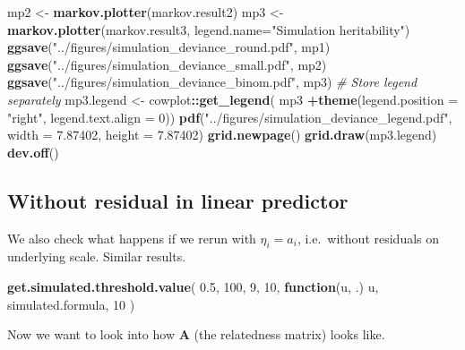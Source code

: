 \documentclass[
]{article}
\newenvironment{Shaded}{\begin{snugshade}}{\end{snugshade}}
\newcommand{\AttributeTok}[1]{\textcolor[rgb]{0.13,0.29,0.53}{#1}}
\newcommand{\CommentTok}[1]{\textcolor[rgb]{0.56,0.35,0.01}{\textit{#1}}}
\newcommand{\ControlFlowTok}[1]{\textcolor[rgb]{0.13,0.29,0.53}{\textbf{#1}}}
\newcommand{\DecValTok}[1]{\textcolor[rgb]{0.00,0.00,0.81}{#1}}
\newcommand{\FloatTok}[1]{\textcolor[rgb]{0.00,0.00,0.81}{#1}}
\newcommand{\FunctionTok}[1]{\textcolor[rgb]{0.13,0.29,0.53}{\textbf{#1}}}
\newcommand{\NormalTok}[1]{#1}
\newcommand{\OtherTok}[1]{\textcolor[rgb]{0.56,0.35,0.01}{#1}}
\newcommand{\SpecialCharTok}[1]{\textcolor[rgb]{0.81,0.36,0.00}{\textbf{#1}}}
\newcommand{\StringTok}[1]{\textcolor[rgb]{0.31,0.60,0.02}{#1}}
\begin{document}
\begin{Shaded}
\begin{Highlighting}[]
\NormalTok{mp2 }\OtherTok{\textless{}{-}} \FunctionTok{markov.plotter}\NormalTok{(markov.result2)}
\NormalTok{mp3 }\OtherTok{\textless{}{-}} \FunctionTok{markov.plotter}\NormalTok{(markov.result3,}
                      \AttributeTok{legend.name=}\StringTok{"Simulation heritability"}\NormalTok{)}
\FunctionTok{ggsave}\NormalTok{(}\StringTok{"../figures/simulation\_deviance\_round.pdf"}\NormalTok{, mp1)}
\FunctionTok{ggsave}\NormalTok{(}\StringTok{"../figures/simulation\_deviance\_small.pdf"}\NormalTok{, mp2)}
\FunctionTok{ggsave}\NormalTok{(}\StringTok{"../figures/simulation\_deviance\_binom.pdf"}\NormalTok{, mp3)}
\CommentTok{\# Store legend separately}
\NormalTok{mp3.legend }\OtherTok{\textless{}{-}}\NormalTok{ cowplot}\SpecialCharTok{::}\FunctionTok{get\_legend}\NormalTok{(}
\NormalTok{  mp3 }\SpecialCharTok{+}\FunctionTok{theme}\NormalTok{(}\AttributeTok{legend.position =} \StringTok{"right"}\NormalTok{, }\AttributeTok{legend.text.align =} \DecValTok{0}\NormalTok{))}
\FunctionTok{pdf}\NormalTok{(}\StringTok{"../figures/simulation\_deviance\_legend.pdf"}\NormalTok{,}
    \AttributeTok{width =} \FloatTok{7.87402}\NormalTok{, }\AttributeTok{height =} \FloatTok{7.87402}\NormalTok{)}
\FunctionTok{grid.newpage}\NormalTok{()}
\FunctionTok{grid.draw}\NormalTok{(mp3.legend)}
\FunctionTok{dev.off}\NormalTok{()}
\end{Highlighting}
\end{Shaded}

\hypertarget{without-residual-in-linear-predictor}{%
\subsection*{Without residual in linear
predictor}\label{without-residual-in-linear-predictor}}

We also check what happens if we rerun with \(\eta_i=a_i\), i.e.~without
residuals on underlying scale. Similar results.

\begin{Shaded}
\begin{Highlighting}[]
\FunctionTok{get.simulated.threshold.value}\NormalTok{(}
  \FloatTok{0.5}\NormalTok{, }\DecValTok{100}\NormalTok{, }\DecValTok{9}\NormalTok{, }\DecValTok{10}\NormalTok{, }\ControlFlowTok{function}\NormalTok{(u, .) u,}
\NormalTok{  simulated.formula, }\DecValTok{10}
\NormalTok{)}
\end{Highlighting}
\end{Shaded}

Now we want to look into how \(\mathbf{A}\) (the relatedness matrix)
looks like.
\end{document}
